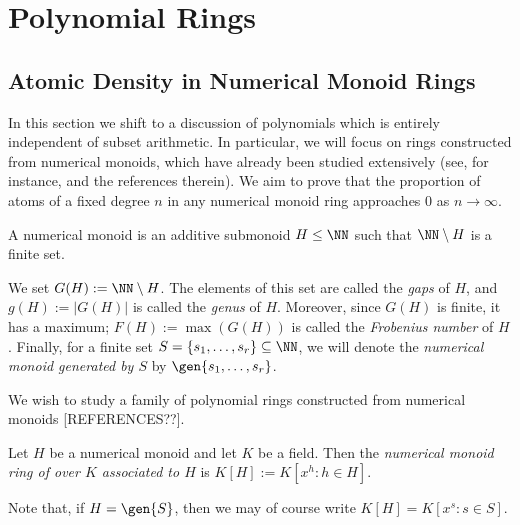 \chapter{Polynomial Rings}






\section{Atomic Density in Numerical Monoid Rings}

In this section we shift to a discussion of polynomials which is entirely independent of subset arithmetic.
In particular, we will focus on rings constructed from numerical monoids, which have already been studied extensively (see, for instance, \cite{oneill-pelayo17,chapman-oneill18} and the references therein).
We aim to prove that the proportion of atoms of a fixed degree $n$ in any numerical monoid ring approaches $0$ as $n\to\infty$.

\begin{defn}
A numerical monoid is an additive submonoid $H \le \NN$ such that $\NN\setminus H$ is a finite set.  

We set $G(H) := \NN \setminus H$. 
The elements of this set are called the \textit{gaps} of $H$, and $g(H) := |G(H)|$ is called the \textit{genus} of $H$.
Moreover, since $G(H)$ is finite, it has a maximum; $F(H) := \max(G(H))$ is called the \textit{Frobenius number} of $H$.
Finally, for a finite set $S = \{s_1,\dots, s_r\}\subseteq \NN$, we will denote the \textit{numerical monoid generated by $S$} by $\gen{s_1,\dots,s_r}$.
\end{defn}


We wish to study a family of polynomial rings constructed from numerical monoids [REFERENCES??].

\begin{defn}
Let $H$ be a numerical monoid and let $K$ be a field.
Then the \textit{numerical monoid ring of over $K$ associated to $H$} is $K[H] := K[x^h : h\in H]$.

Note that, if $H = \gen{S}$, then we may of course write $K[H] = K[x^s: s\in S]$.
\end{defn}


